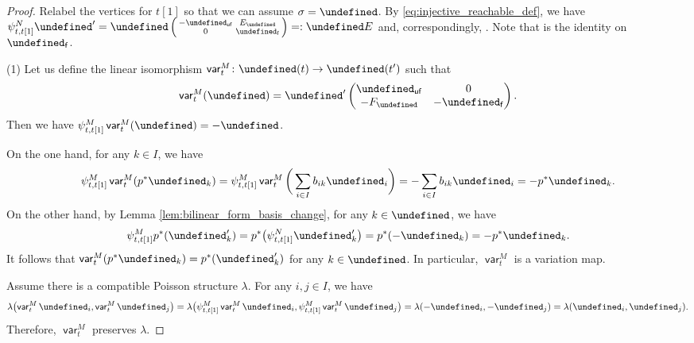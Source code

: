\documentclass[10pt,a4paper]{amsart}
\newcommand{\opname}[1]{\operatorname{\mathsf{#1}}}
\newcommand{\var}{\opname{var}}
\newcommand{\fv}{\opname{f}}
\newcommand{\ufv}{\opname{uf}}
\let\Mc\undefined
\let\Iufv\undefined
\let\Id\undefined
\let\ee\undefined
\let\ff\undefined
\let\uee\undefined
\let\uff\undefined
\let\high\undefined
\let\low\undefined
\newcommand{\Mc}{M^\circ}
\newcommand{\Iufv}{I_{\ufv}}
\newcommand{\Id}{{\opname{Id}}}
\newcommand{\ee}{\mathbf{e}}
\newcommand{\ff}{\mathbf{f}}
\newcommand{\uee}{\underline{\ee}}
\newcommand{\uff}{\underline{\ff}}
\newcommand{\high}{\opname{\ufv,\fv}}
\newcommand{\low}{\opname{\fv,\ufv}}
\numberwithin{equation}{section}
\begin{document}
\begin{proof}

Relabel the vertices for $t[1]$ so that we can assume $\sigma=\Id$.
By \eqref{eq:injective_reachable_def}, we have $\smash{\psi_{t,t[1]}^{N}\uee'}=\allowbreak\smash{\uee\left(\begin{smallmatrix}
-\Id_{\ufv} & E_{\high}\\
0 & \Id_{\fv}
\end{smallmatrix}\right)=:\uee E}$ and, correspondingly, \smash{$\psi^M_{t,t[1]}\uff'=\uff\left(\begin{smallmatrix}
-\Id_{\ufv}&0\\
F_{\low} & \Id_{\fv}
\end{smallmatrix}\right)=:\uff F$}. Note that  is the identity on $\Mc_{\fv}$.

(1) Let us define the linear isomorphism $\var_{t}^{M}\colon\Mc(t)\rightarrow\Mc(t')$
such that
\begin{align*}
\var_{t}^{M}(\uff)=\uff'\begin{pmatrix}
\Id_{\ufv}&0\\
-F_{\low} & -\Id_{\fv}
\end{pmatrix}.
\end{align*}
Then we have $\psi_{t,t[1]}^{M}\var_{t}^{M}(\uff)=-\uff$.

On the one hand, for any $k\in I$, we have
\begin{gather*}
\psi_{t,t[1]}^{M}\var_{t}^{M}(p^{*}\ee_{k}) = \psi_{t,t[1]}^{M}\var_{t}^{M}\bigg(\sum_{i\in I}b_{ik}\ff_{i}\bigg) = -\sum_{i\in I}b_{ik}\ff_{i}= -p^{*}\ee_{k}.
\end{gather*}
On the other hand, by Lemma \ref{lem:bilinear_form_basis_change},
for any $k\in\Iufv$, we have
\begin{gather*}
\psi_{t,t[1]}^{M}p^{*}(\ee_{k}') = p^{*}\big(\psi_{t,t[1]}^{N}\ee_{k}'\big) = p^{*}(-\ee_{k}) = -p^{*}\ee_{k}.
\end{gather*}
It follows that $\var_{t}^{M}(p^{*}\ee_{k})=p^{*}(\ee_{k}')$ for
any $k\in\Iufv$. In particular, $\var_{t}^{M}$ is a variation map.

Assume there is a compatible Poisson structure $\lambda$. For any $i,j\in I$, we have
\begin{gather*}
\lambda\bigl(\var_{t}^{M}\ff_{i},\var_{t}^{M}\ff_{j}\bigr) = \lambda\big(\psi_{t,t[1]}^{M}\var_{t}^{M}\ff_{i},\psi_{t,t[1]}^{M}\var_{t}^{M}\ff_{j}\big)= \lambda(-\ff_{i},-\ff_{j}) = \lambda(\ff_{i},\ff_{j}).
\end{gather*}
Therefore, $\var_{t}^{M}$ preserves $\lambda$.


\end{proof}
\end{document}
